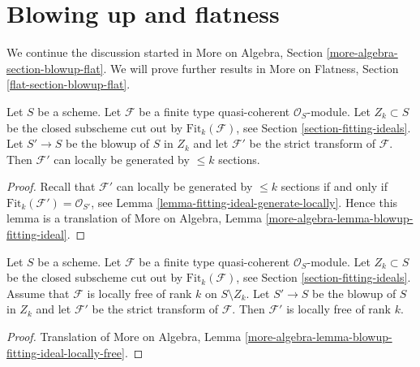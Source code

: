 \section{Blowing up and flatness}
\label{section-blowup-flat}

\noindent
We continue the discussion started in
More on Algebra, Section \ref{more-algebra-section-blowup-flat}.
We will prove further results in More on Flatness, Section
\ref{flat-section-blowup-flat}.


\begin{lemma}
\label{lemma-strict-transform-blowup-fitting-ideal}
Let $S$ be a scheme. Let $\mathcal{F}$ be a finite type
quasi-coherent $\mathcal{O}_S$-module. Let $Z_k \subset S$ be the closed
subscheme cut out by $\text{Fit}_k(\mathcal{F})$, see
Section \ref{section-fitting-ideals}.
Let $S' \to S$ be the blowup of $S$ in $Z_k$ and let
$\mathcal{F}'$ be the strict transform of $\mathcal{F}$.
Then $\mathcal{F}'$ can locally be generated by $\leq k$
sections.
\end{lemma}

\begin{proof}
Recall that $\mathcal{F}'$ can locally be generated by $\leq k$
sections if and only if $\text{Fit}_k(\mathcal{F}') = \mathcal{O}_{S'}$, see
Lemma \ref{lemma-fitting-ideal-generate-locally}.
Hence this lemma is a translation of
More on Algebra, Lemma \ref{more-algebra-lemma-blowup-fitting-ideal}.
\end{proof}

\begin{lemma}
\label{lemma-strict-transform-blowup-fitting-ideal-locally-free}
Let $S$ be a scheme. Let $\mathcal{F}$ be a finite type
quasi-coherent $\mathcal{O}_S$-module. Let $Z_k \subset S$ be the closed
subscheme cut out by $\text{Fit}_k(\mathcal{F})$, see
Section \ref{section-fitting-ideals}.
Assume that $\mathcal{F}$ is locally free of rank $k$ on $S \setminus Z_k$.
Let $S' \to S$ be the blowup of $S$ in $Z_k$ and let
$\mathcal{F}'$ be the strict transform of $\mathcal{F}$.
Then $\mathcal{F}'$ is locally free of rank $k$.
\end{lemma}

\begin{proof}
Translation of More on Algebra, Lemma
\ref{more-algebra-lemma-blowup-fitting-ideal-locally-free}.
\end{proof}

